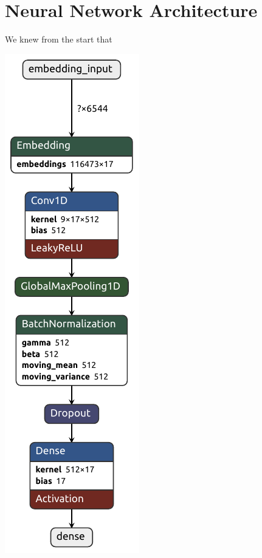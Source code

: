 \section{Neural Network Architecture}

We knew from the start that 

\begin{minipage}{0.48\linewidth}
	\centering
	\includegraphics[height=0.9\textheight]{Images/model_level_1.keras.pdf}
\end{minipage}\hfill
